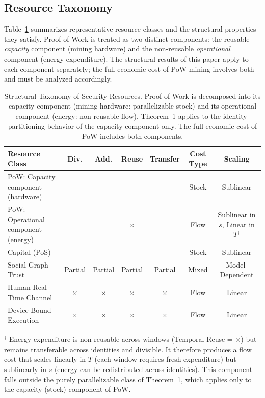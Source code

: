 \documentclass[journal]{IEEEtran}
\begin{document}
	\subsection{Resource Taxonomy}
	Table~\ref{tab:resource_taxonomy} summarizes representative
	resource classes and the structural properties they satisfy.
	Proof-of-Work is treated as two distinct components:
	the reusable \emph{capacity} component (mining hardware)
	and the non-reusable \emph{operational} component (energy
	expenditure). The structural results of this paper apply
	to each component separately; the full economic cost of
	PoW mining involves both and must be analyzed accordingly.
	
	\begin{table}[t]
		\centering
		\small
		\caption{Structural Taxonomy of Security Resources.
			Proof-of-Work is decomposed into its capacity component
			(mining hardware: parallelizable stock) and its operational
			component (energy: non-reusable flow).
			Theorem~1 applies to the identity-partitioning behavior
			of the capacity component only.
			The full economic cost of PoW includes both components.}
		\label{tab:resource_taxonomy}
		
		\begin{tabular}{lcccccc}
			\toprule
			\textbf{Resource Class} & \textbf{Div.} & \textbf{Add.}
			& \textbf{Reuse} & \textbf{Transfer}
			& \textbf{Cost Type} & \textbf{Scaling} \\
			\midrule
			PoW: Capacity component (hardware)
			& \checkmark & \checkmark & \checkmark & \checkmark
			& Stock & Sublinear \\
			PoW: Operational component (energy)
			& \checkmark & \checkmark & $\times$ & \checkmark
			& Flow & Sublinear in $s$, Linear in $T$$^\dagger$ \\
			Capital (PoS)
			& \checkmark & \checkmark & \checkmark & \checkmark
			& Stock & Sublinear \\
			Social-Graph Trust
			& Partial & Partial & Partial & Partial
			& Mixed & Model-Dependent \\
			Human Real-Time Channel
			& $\times$ & $\times$ & $\times$ & $\times$
			& Flow & Linear \\
			Device-Bound Execution
			& $\times$ & $\times$ & $\times$ & $\times$
			& Flow & Linear \\
			\bottomrule
		\end{tabular}
		
		\smallskip
		\raggedright\small
		$^\dagger$ Energy expenditure is non-reusable across windows
		(Temporal Reuse = $\times$) but remains transferable across
		identities and divisible. It therefore produces a flow cost
		that scales linearly in $T$ (each window requires fresh
		expenditure) but sublinearly in $s$ (energy can be
		redistributed across identities).
		This component falls outside the purely parallelizable class
		of Theorem~1, which applies only to the capacity (stock)
		component of PoW.
	\end{table}
	
\end{document}
